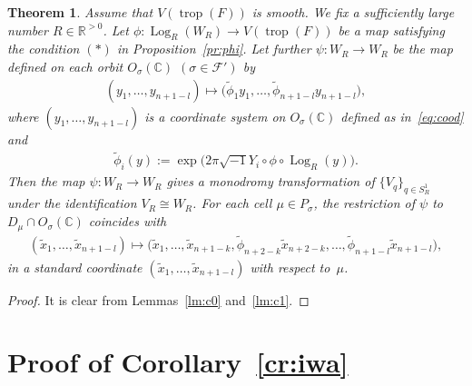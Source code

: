 \documentclass[pdftex]{sigma}
\numberwithin{equation}{section}
\newtheorem{Theorem}{Theorem}[section]
\begin{document}
\begin{Theorem}\label{th:main} Assume that $V(\operatorname{trop}(F))$ is smooth. We fix a sufficiently large number $R \in {\mathbb R}^{>0}$. Let $\phi \colon \operatorname{Log}_R(W_R) \to V(\operatorname{trop}(F))$ be a map satisfying the condition $(\ast)$ in Proposition~{\rm \ref{pr:phi}}. Let further $\psi \colon W_R \to W_R$ be the map defined on each orbit $O_\sigma({\mathbb C})$ $(\sigma \in {\mathcal F}')$ by
\begin{gather}\label{eq:c4}
(y_1, \dots ,y_{n+1-l}) \mapsto \big(\tilde{\phi}_{1}y_1, \dots, \tilde{\phi}_{n+1-l}y_{n+1-l}\big),
\end{gather}
where $(y_1, \dots ,y_{n+1-l})$ is a coordinate system on $O_\sigma({\mathbb C})$ defined as in~\eqref{eq:cood} and
\begin{gather*}
\tilde{\phi}_{i}(y) := \exp \big(2 \pi \sqrt{-1} Y_i \circ \phi \circ \operatorname{Log}_R (y) \big).
\end{gather*}
Then the map $\psi \colon W_R \to W_R$ gives a monodromy transformation of $\{ V_q \}_{q \in S_R^1}$ under the identification $V_R \cong W_R$.
For each cell $\mu \in P_\sigma$, the restriction of $\psi$ to $D_\mu \cap O_\sigma({\mathbb C})$ coincides with
\begin{gather*}
(\tilde{x}_1, \dots, \tilde{x}_{n+1-l}) \mapsto
\big(\tilde{x}_1, \dots, \tilde{x}_{n+1-k}, \tilde{\phi}_{n+2-k}\tilde{x}_{n+2-k}, \dots, \tilde{\phi}_{n+1-l} \tilde{x}_{n+1-l}\big),
\end{gather*}
in a standard coordinate $(\tilde{x}_1, \dots, \tilde{x}_{n+1-l})$ with respect to~$\mu$.
\end{Theorem}
\begin{proof}
It is clear from Lemmas~\ref{lm:c0} and~\ref{lm:c1}.
\end{proof}

\section{Proof of Corollary~\ref{cr:iwa}}\label{sc:5}
\end{document}
